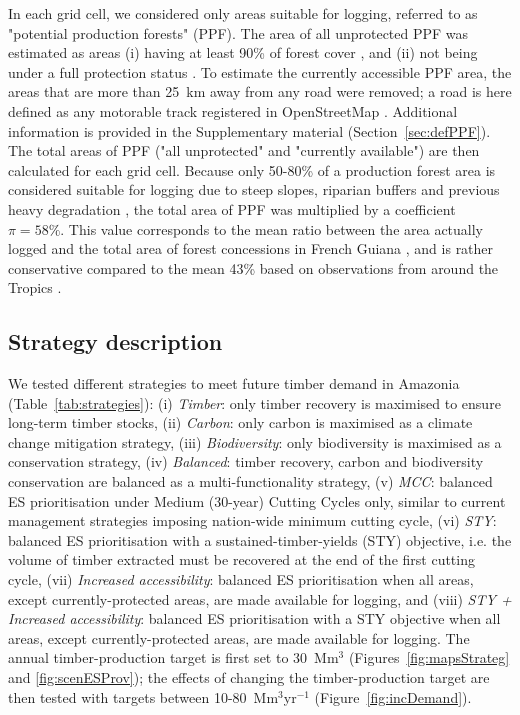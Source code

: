 \documentclass[12pt]{article}
\begin{document}
In each grid cell, we considered only areas suitable for logging, referred to as "potential production forests" (PPF). The area of all unprotected PPF was estimated as areas (i) having at least 90\% of forest cover \cite{Hansen2013}, and (ii) not being under a full protection status \cite{WDPA2016}. To estimate the currently accessible PPF area, the areas that are more than 25~km away from any road were removed; a road is here defined as any motorable track registered in OpenStreetMap \cite{OSM2018}. Additional information is provided in the Supplementary material (Section~\ref{sec:defPPF}). 
The total areas of PPF ("all unprotected" and "currently available") are then calculated for each grid cell. Because only 50-80\% of a production forest area is considered suitable for logging due to steep slopes, riparian buffers and previous heavy degradation \cite{Feldpausch2006,Verissimo2002}, the total area of PPF was multiplied by a coefficient $\pi = 58\%$. This value corresponds to the mean ratio between the area actually logged and the total area of forest concessions in French Guiana \cite{Piponiot2019}, and is rather conservative compared to the mean 43\% based on observations from around the Tropics \cite{Putz2019}.

\subsection*{Strategy description}

We tested different strategies to meet future timber demand in Amazonia (Table~\ref{tab:strategies}): (i) \textit{Timber}: only timber recovery is maximised to ensure long-term timber stocks, (ii) \textit{Carbon}: only carbon is maximised as a climate change mitigation strategy, (iii) \textit{Biodiversity}: only biodiversity is maximised as a conservation strategy, (iv) \textit{Balanced}: timber recovery, carbon and biodiversity conservation are balanced as a multi-functionality strategy, (v) \textit{MCC}: balanced ES prioritisation under Medium (30-year) Cutting Cycles only, similar to current management strategies imposing nation-wide minimum cutting cycle, (vi) \textit{STY}: balanced ES prioritisation with a sustained-timber-yields (STY) objective, i.e. the volume of timber extracted must be recovered at the end of the first cutting cycle, (vii) \textit{Increased accessibility}: balanced ES prioritisation when all areas, except currently-protected areas, are made available for logging, and (viii) \textit{STY + Increased accessibility}: balanced ES prioritisation with a STY objective when all areas, except currently-protected areas, are made available for logging. The annual timber-production target is first set to 30~Mm$^3$ (Figures~\ref{fig:mapsStrateg} and \ref{fig:scenESProv}); the effects of changing the timber-production target are then tested with targets between 10-80~Mm$^3$yr$^{-1}$ (Figure~\ref{fig:incDemand}). 
\end{document}
